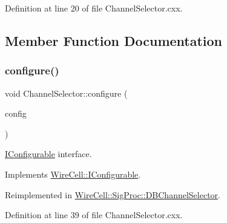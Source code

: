 Definition at line 20 of file Channel\+Selector.\+cxx.



\subsection{Member Function Documentation}
\mbox{\label{class_wire_cell_1_1_sig_proc_1_1_channel_selector_aa7bedd9af19095a19bdd9f2db59b043a}} 
\subsubsection{\texorpdfstring{configure()}{configure()}}
{\footnotesize\ttfamily void Channel\+Selector\+::configure (\begin{DoxyParamCaption}\item[{const \hyperlink{namespace_wire_cell_a9f705541fc1d46c608b3d32c182333ee}{Wire\+Cell\+::\+Configuration} \&}]{config }\end{DoxyParamCaption})\hspace{0.3cm}{\ttfamily [virtual]}}



\hyperlink{class_wire_cell_1_1_i_configurable}{I\+Configurable} interface. 



Implements \hyperlink{class_wire_cell_1_1_i_configurable_a57ff687923a724093df3de59c6ff237d}{Wire\+Cell\+::\+I\+Configurable}.



Reimplemented in \hyperlink{class_wire_cell_1_1_sig_proc_1_1_d_b_channel_selector_ab4b1fc4f57e0d9e9695a962c39ea7a71}{Wire\+Cell\+::\+Sig\+Proc\+::\+D\+B\+Channel\+Selector}.



Definition at line 39 of file Channel\+Selector.\+cxx.

\mbox{\label{class_wire_cell_1_1_sig_proc_1_1_channel_selector_a4327241e133cc7aa3d336bec304cc568}} 
